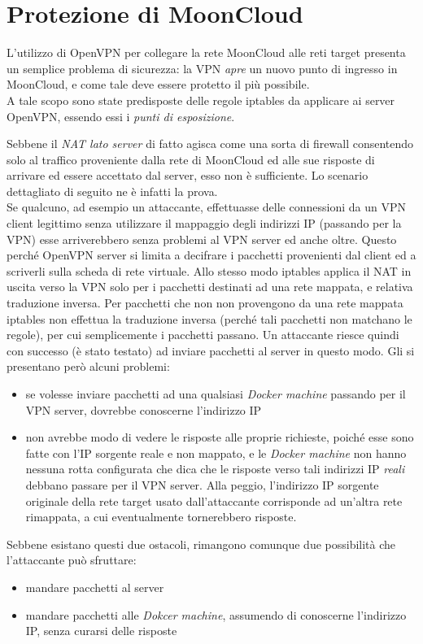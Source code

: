 \section{Protezione di MoonCloud}
L'utilizzo di OpenVPN per collegare la rete MoonCloud alle reti
target presenta un semplice problema di sicurezza: la VPN \textit{apre}
un nuovo punto di ingresso in MoonCloud, e come tale deve essere protetto
il più possibile.\\
A tale scopo sono state predisposte delle regole iptables da applicare
ai server OpenVPN, essendo essi i \textit{punti di esposizione}.


Sebbene il \textit{NAT lato server} di fatto agisca come una sorta
di firewall consentendo solo al traffico proveniente dalla rete
di MoonCloud ed alle sue risposte di arrivare ed essere accettato
dal server, esso non è sufficiente. Lo scenario dettagliato di seguito
ne è infatti la prova.\\
Se qualcuno, ad esempio un attaccante,
effettuasse delle connessioni da un VPN client legittimo senza utilizzare il mappaggio
degli indirizzi IP (passando per la VPN) esse arriverebbero senza problemi
al VPN server ed anche oltre. Questo perché OpenVPN server si limita
a decifrare i pacchetti provenienti dal client ed a scriverli sulla scheda di rete
virtuale. Allo stesso modo iptables applica il NAT in uscita verso la VPN solo per
i pacchetti destinati ad una rete mappata, e relativa traduzione inversa. Per pacchetti
che non non provengono da una rete mappata iptables non effettua la traduzione
inversa (perché tali pacchetti non matchano le regole), per cui semplicemente
i pacchetti passano.
Un attaccante riesce quindi con successo (è stato testato) ad inviare pacchetti
al server in questo modo.
Gli si presentano però alcuni problemi:
\begin{itemize}
	\item se volesse inviare pacchetti ad una qualsiasi \textit{Docker machine}
	      passando per il VPN server, dovrebbe conoscerne l'indirizzo IP
	\item non avrebbe modo di vedere le risposte alle proprie richieste, poiché
	      esse sono fatte con l'IP sorgente reale e non mappato, e le \textit{Docker machine}
	      non hanno nessuna rotta configurata che dica che le risposte verso tali indirizzi
	      IP \textit{reali} debbano passare per il VPN server. Alla peggio, l'indirizzo IP
	      sorgente originale della rete target usato dall'attaccante corrisponde
	      ad un'altra rete rimappata, a cui eventualmente tornerebbero risposte.
\end{itemize}
Sebbene esistano questi due ostacoli, rimangono comunque due possibilità che
l'attaccante può sfruttare:
\begin{itemize}
	\item mandare pacchetti al server
	\item mandare pacchetti alle \textit{Dokcer machine}, assumendo di conoscerne
	      l'indirizzo IP, senza curarsi delle risposte
\end{itemize}


